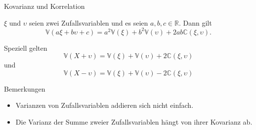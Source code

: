 \documentclass[
  8pt,
  ignorenonframetext,
]{beamer}
\providecommand{\tightlist}{%
  \setlength{\itemsep}{0pt}\setlength{\parskip}{0pt}}
\newcommand{\ups}{\upsilon}
\begin{document}
\begin{frame}{Kovarianz und Korrelation}
\protect\hypertarget{kovarianz-und-korrelation-7}{}
\small
\begin{theorem}
\normalfont
\justifying
$\xi$ und $\ups$ seien zwei Zufallsvariablen und es seien $a,b,c \in \mathbb{R}$. Dann gilt
\begin{equation}
\mathbb{V}(a\xi + b\ups + c) = a^2\mathbb{V}(\xi) + b^2\mathbb{V}(\ups) + 2ab\mathbb{C}(\xi,\ups).
\end{equation}

Speziell gelten
\begin{equation}
\mathbb{V}(X + \ups) = \mathbb{V}(\xi) + \mathbb{V}(\ups) + 2 \mathbb{C}(\xi,\ups)
\end{equation}
und
\begin{equation}
\mathbb{V}(X - \ups) = \mathbb{V}(\xi) + \mathbb{V}(\ups) - 2 \mathbb{C}(\xi,\ups)
\end{equation}
\end{theorem}

Bemerkungen

\begin{itemize}
\tightlist
\item
  Varianzen von Zufallsvariablen addieren sich nicht einfach.
\item
  Die Varianz der Summe zweier Zufallsvariablen hängt von ihrer
  Kovarianz ab.
\end{itemize}
\end{frame}
\end{document}
